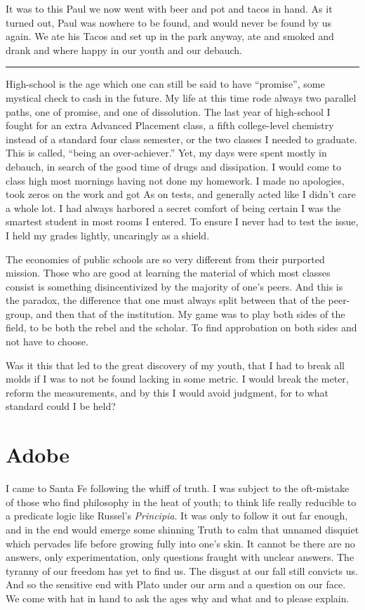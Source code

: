 \documentclass[ebook, 10pt, openright, onecolumn]{memoir}
\newcommand*\starbreak{\fancybreak*{* * *\\}}
\begin{document}
It was to this Paul we now went with beer and pot and tacos in hand.  As it
turned out, Paul was nowhere to be found, and would never be found by us again.
We ate his Tacos and set up in the park anyway, ate and smoked and drank and
where happy in our youth and our debauch.

\starbreak

High-school is the age which one can still be said to have ``promise'', some
mystical check to cash in the future.  My life at this time rode always two
parallel paths, one of promise, and one of dissolution.  The last year of
high-school I fought for an extra Advanced Placement class, a fifth
college-level chemistry instead of a standard four class semester, or the two
classes I needed to graduate. This is called, ``being an over-achiever.''  Yet,
my days were spent mostly in debauch, in search of the good time of drugs
and dissipation.  I would come to class high most mornings having not done my
homework.  I made no apologies, took zeros on the work and got As on tests, and
generally acted like I didn't care a whole lot.  I had always harbored a secret
comfort of being certain I was the smartest student in most rooms I entered.
To ensure I never had to  test the issue, I held my grades lightly, uncaringly
as a shield.  

The economies of public schools are so very different from their purported
mission.  Those who are good at learning the material of which most classes
consist is something disincentivized by the majority of one's peers.  And this
is the paradox, the difference that one must always split between that of the
peer-group, and then that of the institution.  My game was to play both sides of
the field, to be both the rebel and the scholar.  To find approbation on both
sides and not have to choose.

Was it this that led to the great discovery of my youth, that I had to break all
molds if I was to not be found lacking in some metric.  I would break the
meter, reform the measurements, and by this I would avoid judgment, for to what
standard could I be held?  

\chapter{Adobe}
\label{cha:adobe}

I came to Santa Fe following the whiff of truth.  I was subject to the
oft-mistake of those who find philosophy in the heat of youth; to think life
really reducible to a predicate logic like Russel's \textit{Principia}. It was
only to follow it out far enough, and in the end would emerge some shinning
Truth to calm that unnamed disquiet which pervades life before growing fully
into one's skin.  It cannot be there are no answers, only experimentation, only
questions fraught with unclear answers.  The tyranny of our freedom has yet to
find us.  The disgust at our fall still convicts us.  And so the sensitive end
with Plato under our arm and a question on our face.  We come with hat in hand
to ask the ages why and what and to please explain.
\end{document}
